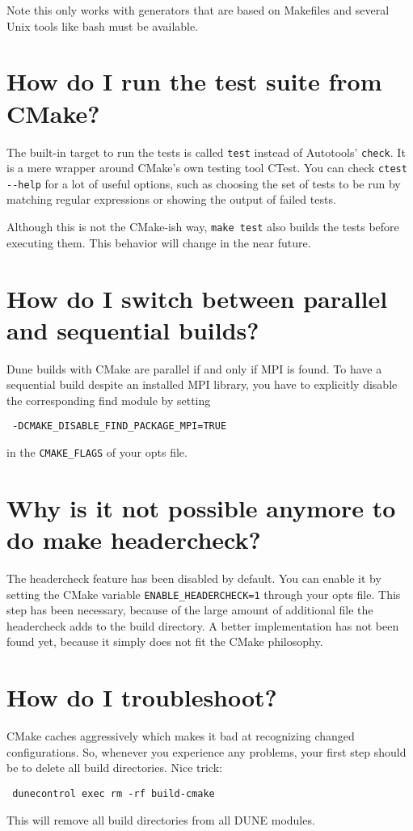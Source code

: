 \documentclass[a4paper,10pt,DIV9,headings=small]{scrartcl}
\begin{document}
Note this only works with generators that are based on Makefiles and several Unix tools like bash must be
available.

\section{How do I run the test suite from CMake?}
\label{tests}
The built-in target to run the tests is called \lstinline!test! instead of Autotools' \lstinline!check!.
It is a mere wrapper around CMake's own testing tool CTest. You can check \lstinline!ctest --help!
for a lot of useful options, such as choosing the set of tests to be run by matching regular expressions or
showing the output of failed tests.

Although this is not the CMake-ish way, \lstinline!make test! also builds the tests before executing them.
This behavior will change in the near future.

\section{How do I switch between parallel and sequential builds?}
\label{parallel}
Dune builds with CMake are parallel if and only if MPI is found. To have a sequential build despite an installed MPI library, you have to explicitly disable the corresponding find module by setting
\begin{lstlisting}
 -DCMAKE_DISABLE_FIND_PACKAGE_MPI=TRUE
\end{lstlisting}
in the \lstinline!CMAKE_FLAGS! of your opts file.

\section{Why is it not possible anymore to do make headercheck?}
\label{headercheck}
The headercheck feature has been disabled by default. You can enable it by setting the CMake variable \lstinline!ENABLE_HEADERCHECK=1! through your opts file. This step has been necessary, because of the large amount of additional file the headercheck adds to the build directory. A better implementation has not been found yet, because it simply does not fit the CMake philosophy.

\section{How do I troubleshoot?}
\label{troubleshoot}
CMake caches aggressively which makes it bad at recognizing changed configurations. So, whenever
you experience any problems, your first step should be to delete all build directories. Nice trick:
\begin{lstlisting}
 dunecontrol exec rm -rf build-cmake
\end{lstlisting}
This will remove all build directories from all DUNE modules.
\end{document}
